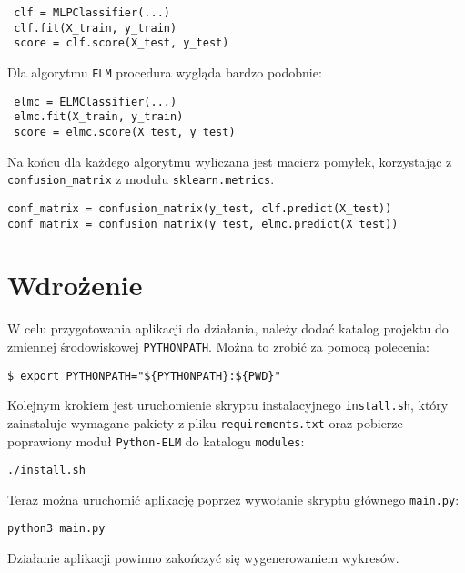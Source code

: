 \begin{verbatim}
 clf = MLPClassifier(...)
 clf.fit(X_train, y_train)
 score = clf.score(X_test, y_test)
\end{verbatim}

Dla algorytmu \texttt{ELM} procedura wygląda bardzo podobnie:

\begin{verbatim}
 elmc = ELMClassifier(...)
 elmc.fit(X_train, y_train)
 score = elmc.score(X_test, y_test)
\end{verbatim}

Na końcu dla każdego algorytmu wyliczana jest macierz pomyłek, korzystając z \texttt{confusion\_matrix} z modułu \texttt{sklearn.metrics}.

\begin{verbatim}
conf_matrix = confusion_matrix(y_test, clf.predict(X_test))
conf_matrix = confusion_matrix(y_test, elmc.predict(X_test))
\end{verbatim}

\section{Wdrożenie}

W celu przygotowania aplikacji do działania, należy dodać katalog projektu do zmiennej środowiskowej \texttt{PYTHONPATH}. Można to zrobić za pomocą polecenia:

\begin{verbatim}
$ export PYTHONPATH="${PYTHONPATH}:${PWD}"
\end{verbatim}

Kolejnym krokiem jest uruchomienie skryptu instalacyjnego \texttt{install.sh}, który zainstaluje wymagane pakiety z pliku \texttt{requirements.txt} oraz pobierze poprawiony moduł \texttt{Python-ELM} do katalogu \texttt{modules}:

\begin{verbatim}
./install.sh
\end{verbatim}

Teraz można uruchomić aplikację poprzez wywołanie skryptu głównego \texttt{main.py}:

\begin{verbatim}
python3 main.py
\end{verbatim}

Działanie aplikacji powinno zakończyć się wygenerowaniem wykresów.